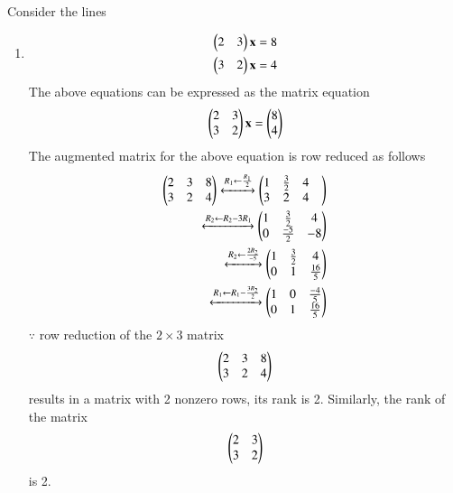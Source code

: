 Consider the lines 
%
\begin{enumerate}
\item
\begin{align}
\begin{split}
\begin{pmatrix}2 & 3 \end{pmatrix}\mathbf{x}&=8
\\
\begin{pmatrix}3 & 2 \end{pmatrix}\mathbf{x}&=4 \label{linform/2/9/1.0.1} 
\end{split}
\end{align}
The above equations can be expressed as the matrix equation
\begin{align}
\begin{pmatrix}2 & 3\\3 & 2\end{pmatrix} \mathbf{x} = \begin{pmatrix}8\\4\end{pmatrix}
\end{align}
%
The augmented matrix for the above equation is row reduced as follows
\begin{align}
\begin{pmatrix}2 & 3 & 8\\3 & 2 & 4\end{pmatrix} 
\xleftrightarrow {R_1\leftarrow \frac{R_1}{2}}\begin{pmatrix}1 & \frac{3}{2} & 4 & \\3 & 2 & 4\end{pmatrix} 
\\
\xleftrightarrow {R_2\leftarrow R_2-3R_1}\begin{pmatrix}1 & \frac{3}{2} & 4 \\0 & \frac{-5}{2} & -8\end{pmatrix}
\\
\xleftrightarrow {R_2\leftarrow \frac{2R_2}{-5}}\begin{pmatrix}1 & \frac{3}{2} & 4 \\0 & 1 & \frac{16}{5}\end{pmatrix}
\\
\xleftrightarrow {R_1\leftarrow  R_1-\frac {3R_2}{2}}\begin{pmatrix}1 & 0 & \frac{-4}{5} \\0 & 1 & \frac{16}{5}\end{pmatrix}
\end{align}
%
$\because$ row reduction of the $2\times 3$ matrix
%
\begin{align}
\begin{pmatrix}2 & 3 & 8\\3 & 2 & 4\end{pmatrix} \label{linform/2/9/2.0.7}
\end{align}
%
results in a matrix with 2 nonzero rows, its rank is 2. 
%
Similarly, the rank of the matrix 
\begin{align}
\begin{pmatrix}2 & 3 \\3 & 2 \end{pmatrix} \label{linform/2/9/2.0.8}
\end{align}
%
is 2.
%
\begin{align}

\end{align}
\end{enumerate}

